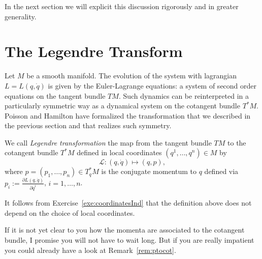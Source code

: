 \documentclass[english,fontsize=11pt,paper=a5,oneside]{scrbook}
\newcommand{\cL}{\mathcal{L}}
\theoremstyle{definition}
\begin{document}
In the next section we will explicit this discussion rigorously and in greater generality.

\section{The Legendre Transform}

Let $M$ be a smooth manifold.
The evolution of the system with lagrangian $L=L(q,\dot q)$ is given by the Euler-Lagrange equations: a system of second order equations on the tangent bundle $TM$.
Such dynamics can be reinterpreted in a particularly symmetric way as a dynamical system on the cotangent bundle $T^*M$.
Poisson and Hamilton have formalized the transformation that we described in the previous section and that realizes such symmetry.

\begin{tcolorbox}
    We call \emph{Legendre transformation} the map from the tangent bundle $TM$ to the cotangent bundle $T^*M$ defined in local coordinates $(q^1, \ldots, q^n)\in M$ by 
    \begin{equation}\label{eq:legrendreTrafo}
        \cL: (q,\dot q) \mapsto (q,p),
    \end{equation}
    where $p = (p_1, \ldots, p_n) \in T^*_q M$ is the conjugate momentum to $q$ defined via $p_i := \frac{\partial L(q,\dot q)}{\partial \dot q^i}$, $i=1,\ldots,n$.
\end{tcolorbox}
It follows from Exercise~\ref{exe:coordinatesInd} that the definition above does not depend on the choice of local coordinates.

If it is not yet clear to you how the momenta are associated to the cotangent bundle, I promise you will not have to wait long. But if you are really impatient you could already have a look at Remark~\ref{rem:ptocot}.
\end{document}
